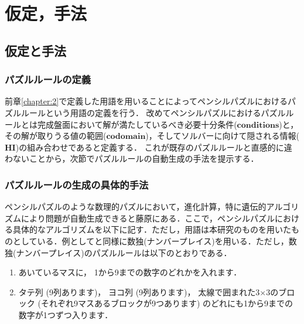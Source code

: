 \chapter{仮定，手法}
\label{chapter:3}

\section{仮定と手法}
\subsection{パズルルールの定義}\label{subsection:PuzzleDefinition}
前章\ref{chapter:2}で定義した用語を用いることによってペンシルパズルにおけるパズルルールという用語の定義を行う．
改めてペンシルパズルにおけるパズルルールとは完成盤面において解が満たしているべき必要十分条件($\mathbf{conditions}$)と，その解が取りうる値の範囲($\mathbf{codomain}$)，そしてソルバーに向けて隠される情報($\mathbf{HI}$)の組み合わせであると定義する．
これが既存のパズルルールと直感的に違わないことから，次節でパズルルールの自動生成の手法を提示する．
\subsection{パズルルールの生成の具体的手法}
ペンシルパズルのような数理的パズルにおいて，進化計算，特に遺伝的アルゴリズムにより問題が自動生成できると藤原\cite{Fujiwara2022}にある．ここで，ペンシルパズルにおける具体的なアルゴリズムを以下に記す．ただし，用語は本研究のものを用いたものとしている．例として\cite{Fujiwara2022}と同様に数独(ナンバープレイス)を用いる．ただし，数独(ナンバープレイス)のパズルルールは以下のとおりである．\cite{web:Sudoku}

\begin{enumerate}
  \item あいているマスに， 1から9までの数字のどれかを入れます．
  \item タテ列 (9列あります)， ヨコ列 (9列あります)， 太線で囲まれた3$\times$3のブロック (それぞれ9マスあるブロックが9つあります) のどれにも1から9までの数字が1つずつ入ります．
\end{enumerate}

